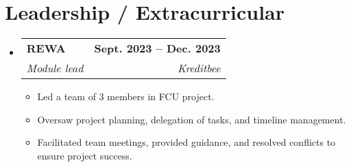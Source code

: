 \documentclass[letterpaper,11pt]{article}
\makeatletter
\newcommand{\resumeItem}[1]{
  \item\small{
    {#1 \vspace{-2pt}}
  }
}
\newcommand{\resumeSubheading}[4]{
  \vspace{-2pt}\item
    \begin{tabular*}{1.0\textwidth}[t]{l@{\extracolsep{\fill}}r}
      \textbf{#1} & \textbf{\small #2} \\
      \textit{\small#3} & \textit{\small #4} \\
    \end{tabular*}\vspace{-7pt}
}
\newcommand{\resumeSubHeadingListStart}{\begin{itemize}[leftmargin=0.0in, label={}]}
\newcommand{\resumeSubHeadingListEnd}{\end{itemize}}
\newcommand{\resumeItemListStart}{\begin{itemize}}
\newcommand{\resumeItemListEnd}{\end{itemize}\vspace{-5pt}}
\makeatother
\begin{document}
\section{Leadership / Extracurricular}
    \resumeSubHeadingListStart
        \resumeSubheading{REWA}{Sept. 2023 -- Dec. 2023}{Module lead}{Kreditbee}
            \resumeItemListStart
                \resumeItem{Led a team of 3 members in FCU project.}
                \resumeItem{Oversaw project planning, delegation of tasks, and timeline management.}
                \resumeItem{Facilitated team meetings, provided guidance, and resolved conflicts to ensure project success.}
            \resumeItemListEnd
    \resumeSubHeadingListEnd
\end{document}
